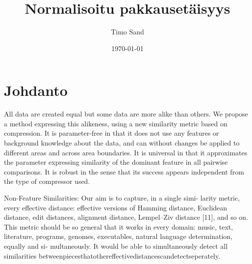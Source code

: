 \documentclass[11pt,finnish]{tktltiki2}
\title{Normalisoitu pakkausetäisyys}
\author{Timo Sand}
\date{\today}
\theoremstyle{definition}
\theoremstyle{remark}
\begin{document}

\frontmatter      %

\maketitle        %

\tableofcontents  %


\mainmatter       %

\section{Johdanto} %
\label{sec:johdanto}
\iffalse
  All data are created equal but some data are more alike than others. We propose a method expressing this alikeness, using a new similarity metric based on compression. It is parameter-free in that it does not use any features or background knowledge about the data, and can without changes be applied to different areas and across area boundaries. It is universal in that it approximates the parameter expressing similarity of the dominant feature in all pairwise comparisons. It is robust in the sense that its success appears independent from the type of compressor used.

  Non-Feature Similarities: Our aim is to capture, in a single simi- larity metric, every effective distance: effective versions of Hamming distance, Euclidean distance, edit distances, alignment distance, Lempel–Ziv distance [11], and so on. This metric should be so general that it works in every domain: music, text, literature, programs, genomes, executables, natural language determination, equally and si- multaneously. It would be able to simultaneously detect all similarities betweenpiecesthatothereffectivedistancescandetectseperately.
\end{document}
